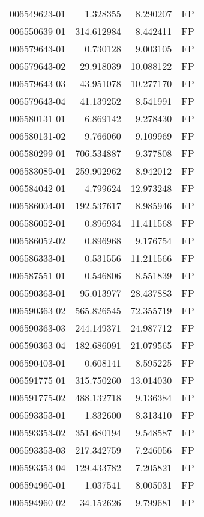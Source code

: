 \begin{tabular}{lrrl}
006549623-01 &    1.328355 &     8.290207 &   FP \\
006550639-01 &  314.612984 &     8.442411 &   FP \\
006579643-01 &    0.730128 &     9.003105 &   FP \\
006579643-02 &   29.918039 &    10.088122 &   FP \\
006579643-03 &   43.951078 &    10.277170 &   FP \\
006579643-04 &   41.139252 &     8.541991 &   FP \\
006580131-01 &    6.869142 &     9.278430 &   FP \\
006580131-02 &    9.766060 &     9.109969 &   FP \\
006580299-01 &  706.534887 &     9.377808 &   FP \\
006583089-01 &  259.902962 &     8.942012 &   FP \\
006584042-01 &    4.799624 &    12.973248 &   FP \\
006586004-01 &  192.537617 &     8.985946 &   FP \\
006586052-01 &    0.896934 &    11.411568 &   FP \\
006586052-02 &    0.896968 &     9.176754 &   FP \\
006586333-01 &    0.531556 &    11.211566 &   FP \\
006587551-01 &    0.546806 &     8.551839 &   FP \\
006590363-01 &   95.013977 &    28.437883 &   FP \\
006590363-02 &  565.826545 &    72.355719 &   FP \\
006590363-03 &  244.149371 &    24.987712 &   FP \\
006590363-04 &  182.686091 &    21.079565 &   FP \\
006590403-01 &    0.608141 &     8.595225 &   FP \\
006591775-01 &  315.750260 &    13.014030 &   FP \\
006591775-02 &  488.132718 &     9.136384 &   FP \\
006593353-01 &    1.832600 &     8.313410 &   FP \\
006593353-02 &  351.680194 &     9.548587 &   FP \\
006593353-03 &  217.342759 &     7.246056 &   FP \\
006593353-04 &  129.433782 &     7.205821 &   FP \\
006594960-01 &    1.037541 &     8.005031 &   FP \\
006594960-02 &   34.152626 &     9.799681 &   FP \\

\end{tabular}
